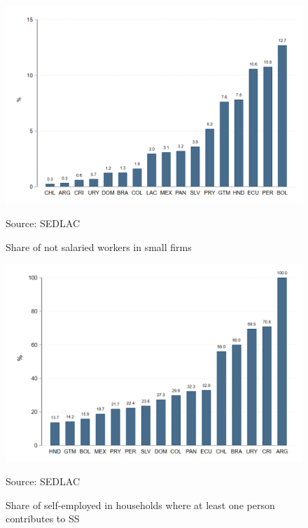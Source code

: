 \documentclass[english]{article}
\begin{document}
\begin{figure}[H]
            \justifying
                \caption{Share of not salaried workers in small firms}  
            \centerline{\includegraphics[scale=.3]{latex/figures/Self-employed/notsalaried_small.png}}
                \label{fig:notsalaried}
                \footnotesize{Source: SEDLAC}
\end{figure}

\begin{figure}[H]
            \justifying
                \caption{Share of self-employed in households where at least one person contributes to SS}  
            \centerline{\includegraphics[scale=.3]{latex/figures/Self-employed/se_contribuye_hogar.png}}
                \label{fig:se-one}
                \footnotesize{Source: SEDLAC}
\end{figure}
\end{document}
